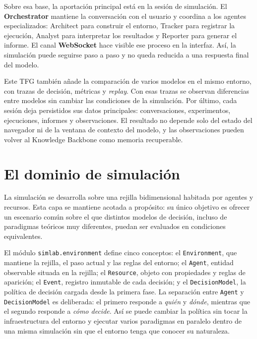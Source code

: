 Sobre esa base, la aportación principal está en la sesión de simulación. El
\textbf{Orchestrator} mantiene la conversación con el usuario y coordina a los
agentes especializados: Architect para construir el entorno, Tracker para
registrar la ejecución, Analyst para interpretar los resultados y Reporter para
generar el informe. El canal \textbf{WebSocket} hace visible ese proceso en la
interfaz. Así, la simulación puede seguirse paso a paso y no queda reducida a
una respuesta final del modelo.

Este TFG también añade la comparación de varios modelos en el mismo entorno,
con trazas de decisión, métricas y \textit{replay}. Con esas trazas se observan
diferencias entre modelos sin cambiar las condiciones de la simulación. Por
último, cada sesión deja persistidos sus datos principales:
conversaciones, experimentos, ejecuciones, informes y observaciones. El
resultado no depende solo del estado del navegador ni de la ventana de contexto
del modelo, y las observaciones pueden volver al Knowledge Backbone como memoria
recuperable.

\section{El dominio de simulación}

La simulación se desarrolla sobre una rejilla bidimensional habitada por
agentes y recursos. Esta capa se mantiene acotada a propósito: su único
objetivo es ofrecer un escenario común sobre el que distintos modelos de
decisión, incluso de paradigmas teóricos muy diferentes, puedan ser
evaluados en condiciones equivalentes.

El módulo \texttt{simlab.environment} define cinco conceptos: el
\texttt{Environment}, que mantiene la rejilla, el paso actual y las reglas
del entorno; el \texttt{Agent}, entidad observable situada en la rejilla; el
\texttt{Resource}, objeto con propiedades y reglas de aparición; el
\texttt{Event}, registro inmutable de cada decisión; y el
\texttt{DecisionModel}, la política de decisión cargada desde la primera fase.
La separación entre \texttt{Agent} y \texttt{DecisionModel} es deliberada:
el primero responde a \emph{quién} y \emph{dónde}, mientras que el segundo
responde a \emph{cómo decide}. Así se puede cambiar la política sin tocar la
infraestructura del entorno y ejecutar varios paradigmas en paralelo dentro de
una misma simulación sin que el entorno tenga que conocer su naturaleza.

